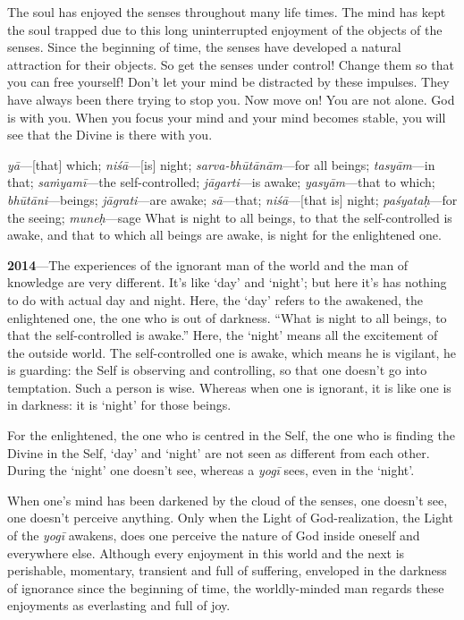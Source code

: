 The soul has enjoyed the senses throughout many life times. The mind has kept the soul trapped due to this long uninterrupted enjoyment of the objects of the senses. Since the beginning of time, the senses have developed a natural attraction for their objects. So get the senses under control! Change them so that you can free yourself! Don’t let your mind be distracted by these impulses. They have always been there trying to stop you. Now move on! You are not alone. God is with you. When you focus your mind and your mind becomes stable, you will see that the Divine is there with you.

{%
  \textit{yā}---[that] which; 
  \textit{niśā}---[is] night; 
  \textit{sarva-bhūtānām}---for all beings; 
  \textit{tasyām}---in that; 
  \textit{saṁyamī}---the self-controlled; 
  \textit{jāgarti}---is awake; 
  \textit{yasyām}---that to which; 
  \textit{bhūtāni}---beings; 
  \textit{jāgrati}---are awake; 
  \textit{sā}---that; 
  \textit{niśā}---[that is] night; 
  \textit{paśyataḥ}---for the seeing; 
  \textit{muneḥ}---sage
}
{%
What is night to all beings, to that the self-controlled is awake, and that to which all beings are awake, is night for the enlightened one.
}

  
\textbf{2014}---The experiences of the ignorant man of the world and the man of knowledge are very different. It’s like ‘day’ and ‘night’; but here it’s has nothing to do with actual day and night. Here, the ‘day’ refers to the awakened, the enlightened one, the one who is out of darkness. “What is night to all beings, to that the self-controlled is awake.”  Here, the ‘night’ means all the excitement of the outside world. The self-controlled one is awake, which means he is vigilant, he is guarding: the Self is observing and controlling, so that one doesn’t go into temptation. Such a person is wise. Whereas when one is ignorant, it is like one is in darkness: it is ‘night’ for those beings.

For the enlightened, the one who is centred in the Self, the one who is finding the Divine in the Self, ‘day’ and ‘night’ are not seen as different from each other. During the ‘night’ one doesn’t see, whereas a \textit{yogī} sees, even in the ‘night’.

When one’s mind has been darkened by the cloud of the senses, one doesn’t see, one doesn’t perceive anything. Only when the Light of God-realization, the Light of the \textit{yogī} awakens, does one perceive the nature of God inside oneself and everywhere else. Although every enjoyment in this world and the next is perishable, momentary, transient and full of suffering, enveloped in the darkness of ignorance since the beginning of time, the worldly-minded man regards these enjoyments as everlasting and full of joy.

